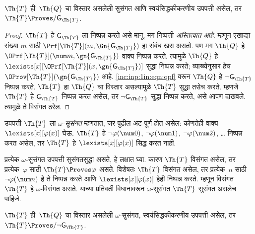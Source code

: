 \begin{lem}\label{inc:inp:1in:lem:cons-G-unprov}
$\Th{T}$ ही~$\Th{Q}$ चा विस्तार असलेली
सुसंगत आणि स्वयंसिद्धकीकरणीय उपपत्ती
असेल, तर $\Th{T} \Proves/ \mathsf{G}_\Th{T}$.
\end{lem}

\begin{proof}
$\Th{T}$ हे $\mathsf{G}_\Th{T}$ ला
निष्पन्न करते असे मानू. मग
निष्पत्ती \emph{अस्तित्वात आहे}.
म्हणून एखाद्या संख्या $m$ साठी
$\Prf[\Th{T}](m,\Gn{\mathsf{G}_\Th{T}})$
हा संबंध खरा असतो. पण मग
$\Th{Q}$ हे
$\OPrf[\Th{T}](\num m, \gn{\mathsf{G}_\Th{T}})$
वाक्य निष्पन्न करते.
त्यामुळे $\Th{Q}$ हे
$\lexists[x][\OPrf[\Th{T}](x,\gn{\mathsf{G}_\Th{T}})]$
सुद्धा निष्पन्न करते; व्याख्येनुसार
हेच $\OProv[\Th{T}](\gn{\mathsf{G}_\Th{T}})$
आहे. \ref{inc:inp:1in:eqn:qpf} वरून
$\Th{Q}$ हे $\lnot \mathsf{G}_\Th{T}$
निष्पन्न करते. $\Th{T}$ हा
$\Th{Q}$ चा विस्तार असल्यामुळे
$\Th{T}$ सुद्धा तसेच करते.
म्हणजे $\Th{T}$ हे $\mathsf{G}_\Th{T}$
निष्पन्न करत असेल, तर
$\lnot \mathsf{G}_\Th{T}$ सुद्धा
निष्पन्न करते, असे आपण दाखवले.
त्यामुळे ते विसंगत ठरेल.
\end{proof}

\begin{defn}
\label{inc:inp:1in:thm:oconsis-q}
उपपत्ती $\Th{T}$ ला
\emph{$\omega$-सुसंगत} म्हणतात, जर
पुढील अट पूर्ण होत असेल: कोणतेही
वाक्य $\lexists[x][\varphi(x)]$ घेऊ.
$\Th{T}$ हे $\lnot \varphi(\num 0)$,
$\lnot \varphi(\num 1)$,
$\lnot \varphi(\num 2)$, \dots
निष्पन्न करत असेल, तर
$\Th{T}$ हे $\lexists[x][\varphi(x)]$ सिद्ध करत नाही.
\end{defn}

प्रत्येक $\omega$-सुसंगत उपपत्ती
सुसंगतसुद्धा असते, हे लक्षात घ्या.
कारण $\Th{T}$ विसंगत असेल, तर
प्रत्येक~$\varphi$ साठी $\Th{T} \Proves \varphi$
असते. विशेषतः $\Th{T}$ विसंगत
असेल, तर प्रत्येक~$n$ साठी
$\lnot \varphi(\num n)$ हे ते
निष्पन्न करते आणि
$\lexists[x][\varphi(x)]$ हेही
निष्पन्न करते.
म्हणून विसंगत $\Th{T}$ हे
$\omega$-विसंगत असते. याच्या
प्रतिवर्ती विधानावरून
$\omega$-सुसंगत $\Th{T}$
सुसंगत असलेच पाहिजे.

\begin{lem}\label{inc:inp:1in:lem:omega-cons-G-unref}
$\Th{T}$ ही~$\Th{Q}$ चा विस्तार
असलेली $\omega$-सुसंगत,
स्वयंसिद्धकीकरणीय उपपत्ती
असेल, तर
$\Th{T} \Proves/ \lnot \mathsf{G}_\Th{T}$.
\end{lem}

